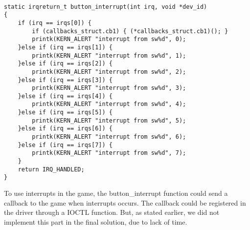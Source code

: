 \\
\begin{lstlisting}
static irqreturn_t button_interrupt(int irq, void *dev_id)
{
	if (irq == irqs[0]) {
		if (callbacks_struct.cb1) { (*callbacks_struct.cb1)(); }
		printk(KERN_ALERT "interrupt from sw%d", 0);
	}else if (irq == irqs[1]) {
		printk(KERN_ALERT "interrupt from sw%d", 1);
	}else if (irq == irqs[2]) {
		printk(KERN_ALERT "interrupt from sw%d", 2);
	}else if (irq == irqs[3]) {
		printk(KERN_ALERT "interrupt from sw%d", 3);
	}else if (irq == irqs[4]) {
		printk(KERN_ALERT "interrupt from sw%d", 4);
	}else if (irq == irqs[5]) {
		printk(KERN_ALERT "interrupt from sw%d", 5);
	}else if (irq == irqs[6]) {
		printk(KERN_ALERT "interrupt from sw%d", 6);
	}else if (irq == irqs[7]) {
		printk(KERN_ALERT "interrupt from sw%d", 7);
	}
	return IRQ_HANDLED;
}
\end{lstlisting}
To use interrupts in the game, the button\_interrupt function could send a callback to the game when interrupts occurs. The callback could be registered in the driver through a IOCTL function. But, as stated earlier, we did not implement this part in the final solution, due to lack of time.
